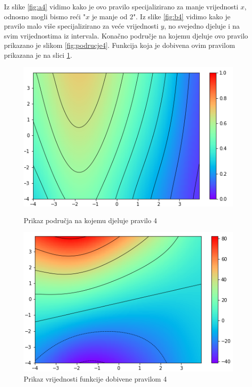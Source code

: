 \documentclass[12pt, a4paper, numeric]{article}
\begin{document}
Iz slike \ref{fig:a4} vidimo kako je ovo pravilo specijalizirano za manje vrijednosti $x$, odnosno mogli bismo reći "$x$ je manje od $2$".
Iz slike \ref{fig:b4} vidimo kako je pravilo malo više specijalizirano za veće vrijednosti $y$, no svejedno djeluje i na svim vrijednostima iz intervala.
Konačno područje na kojemu djeluje ovo pravilo prikazano je slikom \ref{fig:podrucje4}.
Funkcija koja je dobivena ovim pravilom prikazana je na slici \ref{fig:rule4}.
\begin{figure}[!ht]
    \centering
    \begin{minipage}{.5\textwidth}
        \centering
        \includegraphics[width=.9\linewidth]{img/ruleArea4}
        \captionsetup{justification=centering}
        \caption{Prikaz područja na kojemu djeluje pravilo 4}
        \label{fig:podrucje4}
    \end{minipage}%
    \begin{minipage}{.5\textwidth}
        \centering
        \includegraphics[width=.9\linewidth]{img/rule4}
        \captionsetup{justification=centering}
        \caption{Prikaz vrijednosti funkcije dobivene pravilom 4}
        \label{fig:rule4}
    \end{minipage}
\end{figure}



\end{document}
